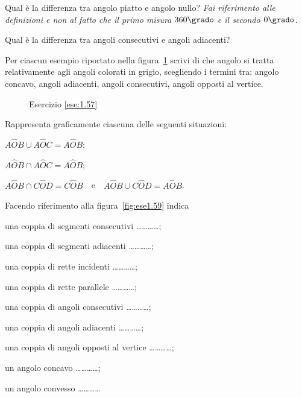 \begin{esercizio}
\label{ese:1.55}
Qual è la differenza tra angolo piatto e angolo nullo? \emph{Fai 
riferimento alle definizioni e non al fatto che il primo misura 
\(360\grado\) e il secondo \(0\grado\).}
\end{esercizio}

\begin{esercizio}
\label{ese:1.56}
Qual è la differenza tra angoli consecutivi e angoli adiacenti?
\end{esercizio}

\begin{esercizio}
\label{ese:1.57}
Per ciascun esempio riportato nella figura~\ref{fig:ese1.57} scrivi 
di che angolo si tratta relativamente agli angoli colorati in grigio, 
scegliendo i termini tra: angolo concavo, angoli adiacenti, angoli 
consecutivi, angoli opposti al vertice.
\end{esercizio}


\begin{inaccessibleblock}
 \begin{figure}[htb]
 \centering
 \caption{Esercizio \ref{ese:1.57}}\label{fig:ese1.57}
\end{figure}
\end{inaccessibleblock}

\begin{esercizio}
\label{ese:1.58}
Rappresenta graficamente ciascuna delle seguenti situazioni:
\begin{enumeratea}
\item \(A\widehat{O}B\cup A\widehat{O}C=A\widehat{O}B\);
\item \(A\widehat{O}B\cap A\widehat{O}C=A\widehat{O}B\);
\item \(A\widehat{O}B\cap 
C\widehat{O}D=C\widehat{O}B\)~~e~~\(A\widehat{O}B\cup 
C\widehat{O}D=A\widehat{O}B\).
\end{enumeratea}
\end{esercizio}

\begin{esercizio}
\label{ese:1.59}
Facendo riferimento alla figura~\ref{fig:ese1.59} indica
\begin{enumeratea}
\item una coppia di segmenti consecutivi \ldots\ldots\ldots\ldots{};
\item una coppia di segmenti adiacenti \ldots\ldots\ldots\ldots{};
\item una coppia di rette incidenti \ldots\ldots\ldots\ldots{};
\item una coppia di rette parallele \ldots\ldots\ldots\ldots{};
\item una coppia di angoli consecutivi \ldots\ldots\ldots\ldots{};
\item una coppia di angoli adiacenti \ldots\ldots\ldots\ldots{};
\item una coppia di angoli opposti al vertice 
\ldots\ldots\ldots\ldots{};
\item un angolo concavo \ldots\ldots\ldots\ldots{};
\item un angolo convesso \ldots\ldots\ldots\ldots{}
\end{enumeratea}
\end{esercizio}


